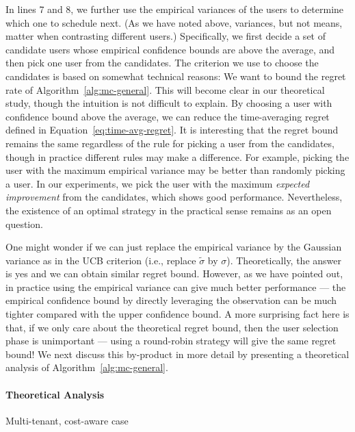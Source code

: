 \documentclass[letterpaper]{vldb}
\begin{document}
In lines 7 and 8, we further use the empirical variances of the users to determine which one to schedule next.
(As we have noted above, variances, but not means, matter when contrasting different users.)
Specifically, we first decide a set of candidate users whose empirical confidence bounds are above the average, and then pick one user from the candidates.
The criterion we use to choose the candidates is based on somewhat technical reasons: We want to bound the regret rate of Algorithm~\ref{alg:mc-general}.
This will become clear in our theoretical study, though the intuition is not difficult to explain.
{\color{red}
By choosing a user with confidence bound above the average, we can reduce the time-averaging regret defined in Equation~\ref{eq:time-avg-regret}.
It is interesting that the regret bound remains the same regardless of the rule for picking a user from the candidates, though in practice different rules may make a difference.
For example, picking the user with the maximum empirical variance may be better than randomly picking a user.
In our experiments, we pick the user with the maximum \emph{expected improvement} from the candidates, which shows good performance.
Nevertheless, the existence of an optimal strategy in the practical sense remains as an open question.
}

One might wonder if we can just replace the empirical variance by the Gaussian variance as in the UCB criterion (i.e., replace $\tilde{\sigma}$ by $\sigma$).
{\color{red} Theoretically, the answer is yes and we can obtain similar regret bound.}
However, as we have pointed out, in practice using the empirical variance can give much better performance --- the empirical confidence bound by directly leveraging the observation can be much tighter compared with the upper confidence bound.
A more surprising fact here is that, if we only care about the theoretical regret bound, then the user selection phase is unimportant --- using a round-robin strategy will give the same regret bound!
We next discuss this by-product in more detail by presenting a theoretical analysis of Algorithm~\ref{alg:mc-general}.

\paragraph*{Theoretical Analysis}

{\color{red} Multi-tenant, cost-aware case}

\end{document}
